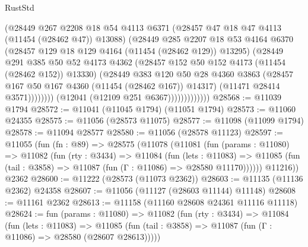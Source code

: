 \begin{lexlean}{RustStd}
\begin{coremodule}
                                (@28449
                                  @267
                                  @2208
                                  @18
                                  @54
                                  @4113
                                  @6371
                                  (@28457 @47 @18 @47 @4113 (@11454 (@28462 @47)) @13088)
                                  (@28449
                                    @285
                                    @2207
                                    @18
                                    @53
                                    @4164
                                    @6370
                                    (@28457 @129 @18 @129 @4164 (@11454 (@28462 @129)) @13295)
                                    (@28449
                                      @291
                                      @385
                                      @50
                                      @52
                                      @4173
                                      @4362
                                      (@28457 @152 @50 @152 @4173 (@11454 (@28462 @152)) @13330)
                                      (@28449
                                        @383
                                        @120
                                        @50
                                        @28
                                        @4360
                                        @3863
                                        (@28457 @167 @50 @167 @4360 (@11454 (@28462 @167)) @14317)
                                        (@11471 @28414 @3571))))))))
                          (@12041 (@12109 @251 @6367)))))))))))))
@28568 := @11039 @1794
@28572 := @11041 (@11045 @1794) (@11051 @1794)
@28573 := @11060 @24355
@28575 := @11056 (@28573 @11075)
@28577 := @11098 (@11099 @1794)
@28578 := @11094 @28577
@28580 := @11056 (@28578 @11123)
@28597 := @11055
    (fun (fn : @89) =>
    @28575
      (@11078
        (@11081
          (fun (params : @11080) =>
          @11082
            (fun (rty : @3434) =>
            @11084
              (fun (lets : @11083) =>
              @11085 (fun (tail : @3858) => @11087 (fun (Γ : @11086) => @28580 @11170))))))
        @11216))
    @2362
@28600 := @11222 (@28573 (@11073 @2362))
@28603 := @11135 (@11136 @2362) @24358
@28607 := @11056 (@11127 (@28603 @11144) @11148)
@28608 := @11161 @2362
@28613 := @11158 (@11160 @28608 @24361 @11116 @11118)
@28624 := fun (params : @11080) =>
  @11082
    (fun (rty : @3434) =>
    @11084
      (fun (lets : @11083) =>
      @11085 (fun (tail : @3858) => @11087 (fun (Γ : @11086) => @28580 (@28607 @28613)))))

\end{coremodule}
\end{lexlean}
